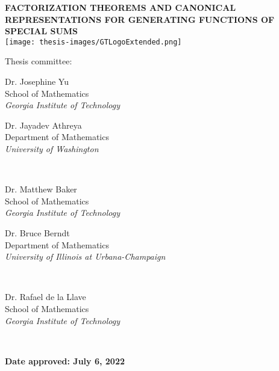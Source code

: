 \documentclass[12pt,reqno,a4letter]{article}
\numberwithin{figure}{section}
\numberwithin{table}{section}
\numberwithin{equation}{section}
\theoremstyle{plain}
\numberwithin{theorem}{section}
\theoremstyle{definition}
\newcommand{\ManuscriptTitle}{Factorization theorems and canonical representations for generating functions of special sums}
\newcommand{\ManuscriptDateApproved}{July 6, 2022}
\newcommand{\TitlePageSmallSkip}{\vspace{0.5cm} \\}
\begin{document}
\newpage
\begin{titlepage}
   \begin{center}
       \vspace*{1cm}
       \large{\textbf{\MakeUppercase{\ManuscriptTitle}}} \\
       \vspace*{2cm}
       \texttt{[image: thesis-images/GTLogoExtended.png]}
       \vspace*{1.75cm}
       \noindent
       \begin{FlushLeft}
       \normalsize Thesis committee:
       \end{FlushLeft}
       \vspace*{0.75cm}
       \begin{minipage}{0.5\textwidth}
       \normalsize Dr. Josephine Yu \\ 
       \normalsize School of Mathematics \\ 
       \normalsize \textit{Georgia Institute of Technology}
       \end{minipage}\hfil
       \begin{minipage}{0.5\textwidth}
       \normalsize Dr. Jayadev Athreya \\ 
       \normalsize Department of Mathematics \\ 
       \normalsize \textit{University of Washington}
       \end{minipage}
       \TitlePageSmallSkip
       \begin{minipage}{0.5\textwidth}
       \normalsize Dr. Matthew Baker \\ 
       \normalsize School of Mathematics \\ 
       \normalsize \textit{Georgia Institute of Technology}
       \end{minipage}\hfil
       \begin{minipage}{0.5\textwidth}
       \normalsize Dr. Bruce Berndt \\ 
       \normalsize Department of Mathematics \\ 
       \normalsize \textit{University of Illinois at Urbana-Champaign}
       \end{minipage}
       \TitlePageSmallSkip
       \begin{minipage}{\textwidth}
       \normalsize Dr. Rafael de la Llave \\ 
       \normalsize School of Mathematics \\ 
       \normalsize \textit{Georgia Institute of Technology}
       \end{minipage}
       \TitlePageSmallSkip
       \begin{FlushRight}
       \textbf{\textrm{\normalsize Date approved: \ManuscriptDateApproved}}
       \end{FlushRight}
       \vfill 
   \end{center}
\end{titlepage}
\end{document}
